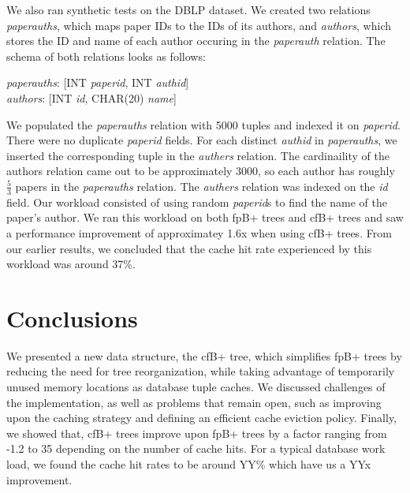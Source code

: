 \documentclass{article}
\begin{document}
We also ran synthetic tests on the DBLP dataset. We created two relations \textit{paperauths}, which maps paper IDs to the IDs of its authors, and \textit{authors}, which stores the ID and name of each author occuring in the \textit{paperauth} relation. The schema of both relations looks as follows:

\textit{paperauths}: [INT \textit{paperid}, INT \textit{authid}] \\
\textit{authors}: [INT \textit{id}, CHAR(20) \textit{name}]

We populated the \textit{paperauths} relation with 5000 tuples and indexed it on \textit{paperid}. There were no duplicate \textit{paperid} fields. For each distinct \textit{authid} in \textit{paperauths}, we inserted the corresponding tuple in the \textit{authers} relation. The cardinaility of the authors relation came out to be approximately 3000, so each author has roughly $\frac{5}{3}$ papers in the \textit{paperauths} relation. The \textit{authers} relation was indexed on the \textit{id} field. Our workload consisted of using random \textit{paperid}s to find the name of the paper's author. We ran this workload on both fpB+ trees and cfB+ trees and saw a performance improvement of approximatey 1.6x when using cfB+ trees. From our earlier results, we concluded that the cache hit rate experienced by this workload was around 37\%.

\section{Conclusions}
We presented a new data structure, the cfB+ tree, which simplifies fpB+ trees by
reducing the need for tree reorganization,
while taking advantage of temporarily unused memory locations as database tuple
caches.
We discussed challenges of the implementation, as well as problems that remain
open,
such as improving upon the caching strategy and defining an efficient cache
eviction policy.
Finally, we showed that, cfB+ trees improve upon fpB+ trees by a factor ranging
from -1.2 to 35 depending on the number of cache hits. For a typical database
work load, we found the cache hit rates to be around YY\% which have us a YYx
improvement.

\small



\end{document}
